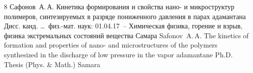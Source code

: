 \begin{thebibliography}{8}
\by Сафонов~А.\,А. 
\thesis Кинетика формирования и свойства нано- и микроструктур полимеров, синтезируемых в разряде пониженного давления в парах адамантана
\thesisinfo Дисс. канд. \dots\ физ.-мат. наук: 01.04.17~-- Химическая физика, горение и взрыв, физика экстремальных состояний вещества 
\publaddr Самара 
\misctransl
\by Safonov~A.\,A.
\thesis The kinetics of formation and properties of nano- and microstructures of the polymers synthesized in the discharge of low pressure in the vapor adamantane
\thesisinfo Ph.D. Thesis  (Phys. \& Math.)
\publaddr Samara

\end{thebibliography}


\noindent
\hskip6.5cm \thedate \par\noindent
\hskip6.5cm\therevdate



%

\makeengtitlem

\renewcommand{\baselinestretch}{0.9}

\newpage

%
%
%
